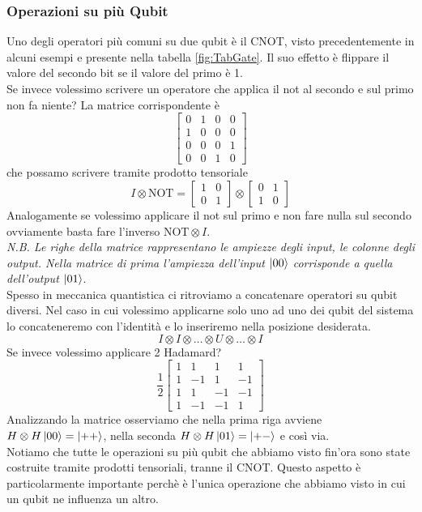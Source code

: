 \documentclass{article}
\begin{document}
    \subsubsection{Operazioni su più Qubit}
    Uno degli operatori più comuni su due qubit è il CNOT, visto precedentemente in alcuni esempi e presente nella tabella \ref{fig:TabGate}. Il suo effetto è flippare il valore del secondo bit se il valore del primo è 1.
    \\Se invece volessimo scrivere un operatore che applica il not al secondo e sul primo non fa niente? La matrice corrispondente è
    \[
    \begin{bmatrix}
        0 & 1 & 0 & 0
        \\ 1 & 0 & 0 & 0
        \\ 0 & 0 & 0 & 1
        \\ 0 & 0 & 1 & 0
    \end{bmatrix}
    \]
    che possamo scrivere tramite prodotto tensoriale
    \[
     I \otimes \text{NOT} = \begin{bmatrix}
        1 & 0 \\ 0 & 1
     \end{bmatrix}
     \otimes \begin{bmatrix}
         0 & 1 \\ 1 & 0
     \end{bmatrix}
    \]
    Analogamente se volessimo applicare il not sul primo e non fare nulla sul secondo ovviamente basta fare l'inverso $\text{NOT} \otimes I $.
    \medskip
    \\ \textit{N.B. Le righe della matrice rappresentano le ampiezze degli input, le colonne degli output. Nella matrice di prima l'ampiezza dell'input $\ket{00}$ corrisponde a quella dell'output $\ket{01}$}.
    \medskip
    \\
    Spesso in meccanica quantistica ci ritroviamo a concatenare operatori su qubit diversi. Nel caso in cui volessimo applicarne solo uno ad uno dei qubit del sistema lo concateneremo con l'identità e lo inseriremo nella posizione desiderata.
    \[
    I \otimes I \otimes \dots \otimes U \otimes \dots \otimes I
    \]
    Se invece volessimo applicare 2 Hadamard?
    \[
    \frac{1}{2}
    \begin{bmatrix}
        1 & 1 & 1 & 1
        \\ 1 & -1 & 1 & -1
        \\ 1 & 1 &- 1 & -1
        \\ 1 & -1 & -1 & 1
    \end{bmatrix}
    \]
    Analizzando la matrice osserviamo che nella prima riga avviene $ H \otimes H \ket{00} = \ket{++}$, nella seconda $ H \otimes H \ket{01} = \ket{+-}$ e così via.
    \\Notiamo che tutte le operazioni su più qubit che abbiamo visto fin'ora sono state costruite tramite prodotti tensoriali, tranne il CNOT. Questo aspetto è particolarmente importante perchè è l'unica operazione che abbiamo visto in cui un qubit ne influenza un altro.
\end{document}
